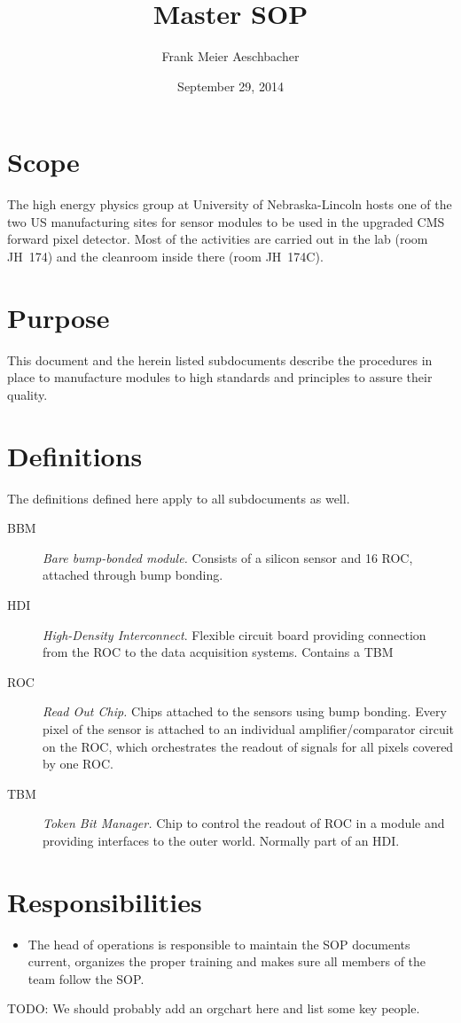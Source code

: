 \documentclass[12pt]{unlsilabsop}
\title{Master SOP}
\date{September 29, 2014}
\author{Frank Meier Aeschbacher}
\begin{document}
\maketitle

\section{Scope}
The high energy physics group at University of Nebraska-Lincoln hosts one of the two US manufacturing sites for sensor modules to be used in the upgraded CMS forward pixel detector. Most of the activities are carried out in the lab (room JH~174) and the cleanroom inside there (room JH~174C).

\section{Purpose}
This document and the herein listed subdocuments describe the procedures in place to manufacture modules to high standards and principles to assure their quality.

\section{Definitions}
The definitions defined here apply to all subdocuments as well.
\begin{description}
    \item[BBM] \emph{Bare bump-bonded module.} Consists of a silicon sensor and 16 ROC, attached through bump bonding.
    \item[HDI] \emph{High-Density Interconnect}. Flexible circuit board providing connection from the ROC to the data acquisition systems. Contains a TBM
    \item[ROC] \emph{Read Out Chip.} Chips attached to the sensors using bump bonding. Every pixel of the sensor is attached to an individual amplifier/comparator circuit on the ROC, which orchestrates the readout of signals for all pixels covered by one ROC.
    \item[TBM] \emph{Token Bit Manager.} Chip to control the readout of ROC in a module and providing interfaces to the outer world. Normally part of an HDI.
\end{description}

\section{Responsibilities}
\begin{itemize}
    \item The head of operations is responsible to maintain the SOP documents current, organizes the proper training and makes sure all members of the team follow the SOP.
\end{itemize}
TODO: We should probably add an orgchart here and list some key people.
\end{document}
